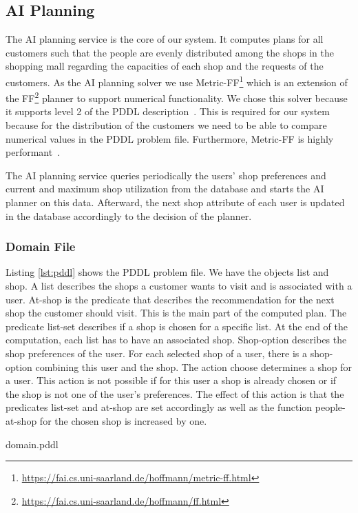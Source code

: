 \documentclass[runningheads]{llncs}
\begin{document}
\subsection{AI Planning}\label{sec:ai}
The AI planning service is the core of our system. It computes plans for all customers such that the people are evenly distributed among the shops in the shopping mall regarding the capacities of each shop and the requests of the customers. As the AI planning solver we use Metric-FF\footnote{\url{https://fai.cs.uni-saarland.de/hoffmann/metric-ff.html}} which is an extension of the FF\footnote{\url{https://fai.cs.uni-saarland.de/hoffmann/ff.html}} planner to support numerical functionality. We chose this solver because it supports level 2 of the PDDL description~\cite{hoffmann2003metric}. This is required for our system because for the distribution of the customers we need to be able to compare numerical values in the PDDL problem file. Furthermore, Metric-FF is highly performant~\cite{hoffmann2003metric}. 

The AI planning service queries periodically the users' shop preferences and current and maximum shop utilization from the database and starts the AI planner on this data. Afterward, the next shop attribute of each user is updated in the database accordingly to the decision of the planner.

\subsubsection{Domain File}
Listing \ref{lst:pddl} shows the PDDL problem file. We have the objects list and shop. A list describes the shops a customer wants to visit and is associated with a user. At-shop is the predicate that describes the recommendation for the next shop the customer should visit. This is the main part of the computed plan. The predicate list-set describes if a shop is chosen for a specific list. At the end of the computation, each list has to have an associated shop. Shop-option describes the shop preferences of the user. For each selected shop of a user, there is a shop-option combining this user and the shop. The action choose determines a shop for a user. This action is not possible if for this user a shop is already chosen or if the shop is not one of the user's preferences. The effect of this action is that the predicates list-set and at-shop are set accordingly as well as the function people-at-shop for the chosen shop is increased by one.

  {domain.pddl}
\end{document}
